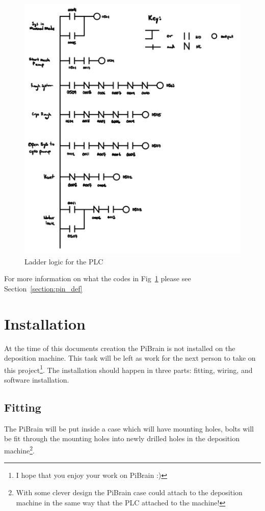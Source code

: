 \documentclass[titlepage]{article}
\begin{document}
\begin{center}
    \begin{figure}[h!]
      \includegraphics[scale=0.4]{IMG_0434.jpg}
      \caption{Ladder logic for the PLC}
      \label{fig:ladder}
    \end{figure}
\end{center}
For more information on what the codes in Fig~\ref{fig:ladder} please see Section~\ref{section:pin_def}

\section{Installation}
At the time of this documents creation the PiBrain is not installed on the deposition machine. This task will be left as work for the next person to take on this project\footnote{I hope that you enjoy your work on PiBrain :)}. The installation should happen in three parts: fitting, wiring, and software installation. 

\subsection{Fitting}
The PiBrain will be put inside a case which will have mounting holes, bolts will be fit through the mounting holes into newly drilled holes in the deposition machine\footnote{With some clever design the PiBrain case could attach to the deposition machine in the same way that the PLC attached to the machine!}.\\
\end{document}

